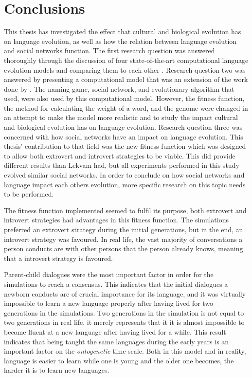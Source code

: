 \acresetall
\chapter{Conclusions}\label{ch:Conclusion}

This thesis has investigated the effect that cultural and biological evolution has on language evolution, as well as how the relation between language evolution and social networks function. The first research question was answered thoroughly through the discussion of four state-of-the-art computational language evolution models and comparing them to each other \citet{lipowska2011naming, lekvam2014co, gong2011simulating, munroe2002learning}. Research question two was answered by presenting a computational model that was an extension of the work done by \citeauthor{lekvam2014co}. The naming game, social network, and evolutionary algorithm that \citeauthor{lekvam2014co} used, were also used by this computational model. However, the fitness function, the method for calculating the weight of a word, and the genome were changed in an attempt to make the model more realistic and to study the impact cultural and biological evolution has on language evolution. Research question three was concerned with how social networks have an impact on language evolution. This thesis' contribution to that field was the new fitness function which was designed to allow both extrovert and introvert strategies to be viable. This did provide different results than Lekvam had, but all experiments performed in this study evolved similar social networks. In order to conclude on how social networks and language impact each others evolution, more specific research on this topic needs to be performed.
 
The fitness function implemented seemed to fulfil its purpose, both extrovert and introvert strategies had advantages in this fitness function. The simulations preferred an extrovert strategy during the initial generations, but in the end, an introvert strategy was favoured. In real life, the vast majority of conversations a person conducts are with other persons that the person already knows, meaning that a introvert strategy is favoured.
 
Parent-child dialogues were the most important factor in order for the simulations to reach a consensus. This indicates that the initial dialogues a newborn conducts are of crucial importance for its language, and it was virtually impossible to learn a new language properly after having lived for two generations in the simulations. Two generations in the simulation is not equal to two generations in real life, it merely represents that it it is almost impossible to become fluent at a new language after having lived for a while. This result indicates that being taught the same languages during the early years is an important factor on the \textit{ontogenetic} time scale. Both in this model and in reality, language is easier to learn while one is young and the older one becomes, the harder it is to learn new languages.
 

